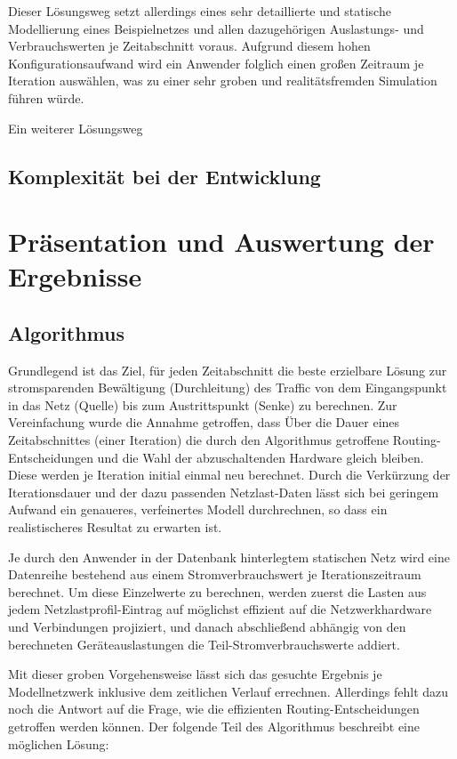 \documentclass[12pt,titlepage]{article}
\begin{document}
Dieser Lösungsweg setzt allerdings eines sehr detaillierte und statische Modellierung eines Beispielnetzes und allen dazugehörigen Auslastungs- und Verbrauchswerten je Zeitabschnitt voraus. Aufgrund diesem hohen Konfigurationsaufwand wird ein Anwender folglich einen großen Zeitraum je Iteration auswählen, was zu einer sehr groben und realitätsfremden Simulation führen würde.

Ein weiterer Lösungsweg  


\subsection{Komplexität bei der Entwicklung}

\section{Präsentation und Auswertung der Ergebnisse} \label{Ergebnisse}
\subsection{Algorithmus}
Grundlegend ist das Ziel, für jeden Zeitabschnitt die beste erzielbare Lösung zur stromsparenden Bewältigung (Durchleitung) des Traffic von dem Eingangspunkt in das Netz (Quelle) bis zum Austrittspunkt (Senke) zu berechnen. Zur Vereinfachung wurde die Annahme getroffen, dass Über die Dauer eines Zeitabschnittes (einer Iteration) die durch den Algorithmus getroffene Routing-Entscheidungen und die Wahl der abzuschaltenden Hardware gleich bleiben. Diese werden je Iteration initial einmal neu berechnet. Durch die Verkürzung der Iterationsdauer und der dazu passenden Netzlast-Daten lässt sich bei geringem Aufwand ein genaueres, verfeinertes Modell durchrechnen, so dass ein realistischeres Resultat zu erwarten ist.

Je durch den Anwender in der Datenbank hinterlegtem statischen Netz wird eine Datenreihe bestehend aus einem Stromverbrauchswert je Iterationszeitraum berechnet.
Um diese Einzelwerte zu berechnen, werden zuerst die Lasten aus jedem Netzlastprofil-Eintrag auf möglichst effizient auf die Netzwerkhardware und Verbindungen projiziert, und danach abschließend abhängig von den berechneten Geräteauslastungen die Teil-Stromverbrauchswerte addiert.

Mit dieser groben Vorgehensweise lässt sich das gesuchte Ergebnis je Modellnetzwerk inklusive dem zeitlichen Verlauf errechnen. Allerdings fehlt dazu noch die Antwort auf die Frage, wie die effizienten Routing-Entscheidungen getroffen werden können. Der folgende Teil des Algorithmus beschreibt eine möglichen Lösung:
\end{document}
